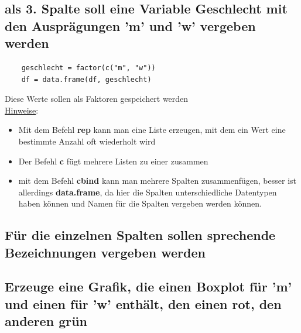 \documentclass{article}
\begin{document}
\subsection{als 3. Spalte soll eine Variable Geschlecht mit den Ausprägungen 'm' und 'w' vergeben werden}
\begin{lstlisting}
	geschlecht = factor(c("m", "w"))
	df = data.frame(df, geschlecht)
\end{lstlisting}

Diese Werte sollen als Faktoren gespeichert werden \\

\underline{Hinweise}:
\begin{itemize}
	\item Mit dem Befehl \textbf{rep} kann man eine Liste erzeugen, mit dem ein Wert eine bestimmte Anzahl oft wiederholt wird
	\item Der Befehl \textbf{c} fügt mehrere Listen zu einer zusammen
	\item mit dem Befehl \textbf{cbind} kann man mehrere Spalten zusammenfügen, besser ist allerdings \textbf{data.frame}, da hier die Spalten unterschiedliche Datentypen haben können und Namen für die Spalten vergeben werden können.
\end{itemize}

\subsection{Für die einzelnen Spalten sollen sprechende Bezeichnungen vergeben werden}

\subsection{Erzeuge eine Grafik, die einen Boxplot für 'm' und einen für 'w' enthält, den einen rot, den anderen grün}
\end{document}
